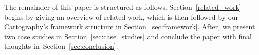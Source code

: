 The remainder of this paper is structured as follows.
Section~\ref{related_work} begins by giving an overview of related work, which
is then followed by our \textsf{Cartography}'s framework structure in
Section~\ref{sec:framework}.  After, we present two case studies in
Section~\ref{sec:case_studies} and conclude the paper with final thoughts
in~Section~\ref{sec:conclusion}.
